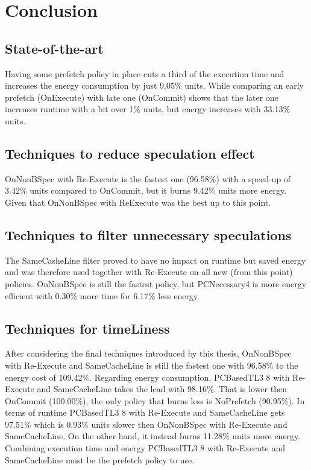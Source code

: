 \chapter{Conclusion}
\label{chap:conclusion}

\section{State-of-the-art} Having some prefetch policy in place cuts a third of the execution time and increases  the energy consumption by just 9.05\% units. While comparing an early prefetch
(OnExecute) with late one (OnCommit) shows that the later one increases runtime
with a bit over 1\% units, but energy increases with 33.13\% units.

\section{Techniques to reduce speculation effect}  OnNonBSpec with Re-Execute is the fastest one (96.58\%) with a speed-up of 3.42\%
units compared to OnCommit, but it burns 9.42\% units more energy. Given that OnNonBSpec with ReExecute was the best up to this point. 

\section{Techniques to filter unnecessary speculations} The SameCasheLine filter proved to have no impact on runtime but saved energy and was therefore used together with Re-Execute on all new (from this point) policies. OnNonBSpec is still the fastest policy, but PCNecessary4 is more energy efficient with 0.30\% more time for 6.17\% less energy.

\section{Techniques for timeLiness} 
After considering the final techniques introduced by this thesis, OnNonBSpec with
Re-Execute and SameCacheLine is still the fastest one with 96.58\% to the energy
cost of 109.42\%. Regarding energy consumption, PCBasedTL3 8 with Re-Execute
and SameCacheLine takes the lead with 98.16\%. That is lower then OnCommit
(100.00\%), the only policy that burns less is NoPrefetch (90.95\%). In terms of runtime
PCBasedTL3 8 with Re-Execute and SameCacheLine gets 97.51\% which is 0.93\%
units slower then OnNonBSpec with Re-Execute and SameCacheLine. On the other
hand, it instead burns 11.28\% units more energy. Combining execution time and
energy PCBasedTL3 8 with Re-Execute and SameCacheLine must be the prefetch
policy to use.
